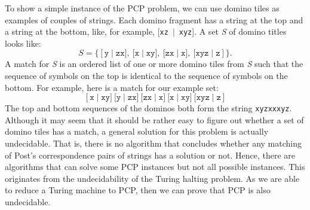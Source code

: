 To show a simple instance of the PCP problem, we can use domino tiles as examples of couples of strings. Each domino fragment has a string at the top and a string at the bottom, like, for example, [\texttt{xz}~$|$~\texttt{xyz}]. A set \textit{S} of domino titles looks like:
\[
{S}=\{[\texttt{y}\mid\texttt{zx}\big],\
 \big[\texttt{x}\mid\texttt{xy}\big],\
 \big[\texttt{zx}\mid \texttt{x}\big],\
 \big[\texttt{xyz}\mid\texttt{z}]
 \}.
\]
A match for \textit{S} is an ordered list of one or more domino tiles from \textit{S} such that the sequence of symbols on the top is identical to the sequence of symbols on the bottom. For example, here is a match for our example set:
\[
[\texttt{x}\mid\texttt{xy}\big]\
 \big[\texttt{y}\mid\texttt{zx}\big]\
 \big[\texttt{zx}\mid\texttt{x}\big]\
 \big[\texttt{x}\mid\texttt{xy}\big]\
 \big[\texttt{xyz}\mid\texttt{z}]
\]
The top and bottom sequences of the dominos both form the string \texttt{xyzxxxyz}. Although it may seem that it should be rather easy to figure out whether a set of domino tiles has a match, a general solution for this problem is actually undecidable. That is, there is no algorithm that concludes whether any matching of Post's correspondence pairs of strings has a solution or not. Hence, there are algorithms that can solve some PCP instances but not all possible instances. This originates from the undecidability of the Turing halting problem. As we are able to reduce a Turing machine to PCP, then we can prove that PCP is also undecidable.


